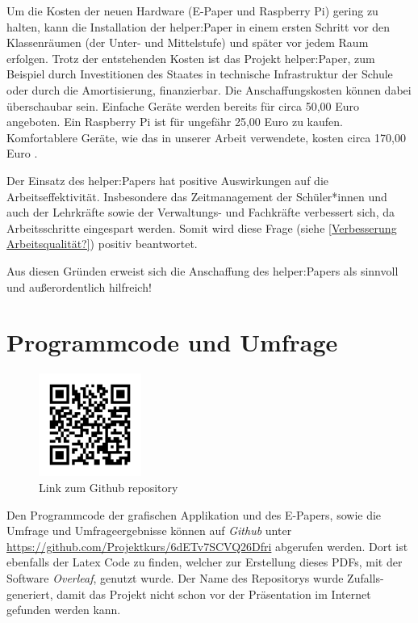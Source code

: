\documentclass[10pt]{article}
\begin{document}
Um die Kosten der neuen Hardware (E-Paper und Raspberry Pi) gering zu halten, kann die Installation der helper:Paper in einem ersten Schritt vor den Klassenräumen (der Unter- und Mittelstufe) und später vor jedem Raum erfolgen. Trotz der entstehenden Kosten ist das Projekt helper:Paper, zum Beispiel durch Investitionen des Staates in technische Infrastruktur der Schule oder durch die Amortisierung, finanzierbar. Die Anschaffungskosten können dabei überschaubar sein. Einfache Geräte werden bereits für circa 50,00 Euro \cite{günstiges_E-Paper} angeboten. Ein Raspberry Pi ist für ungefähr 25,00 Euro \cite{günstiger_RaspberryPi} zu kaufen. Komfortablere Geräte, wie das in unserer Arbeit verwendete, kosten circa 170,00 Euro \cite{ourepd}.

Der Einsatz des helper:Papers hat positive Auswirkungen auf die Arbeitseffektivität. Insbesondere das Zeitmanagement der Schüler*innen und auch der Lehrkräfte sowie der Verwaltungs- und Fachkräfte verbessert sich, da Arbeitsschritte eingespart werden. Somit wird diese Frage (siehe \ref{Verbesserung Arbeitsqualität?}) positiv beantwortet.

Aus diesen Gründen erweist sich die Anschaffung des helper:Papers als sinnvoll und außerordentlich hilfreich!
\section{Programmcode und Umfrage} 
\label{Anhang}
\begin{figure}
  \centering 
  \includegraphics[width=0.3\textwidth]{qr.png}
  \caption{Link zum Github repository}
\end{figure}
Den Programmcode der grafischen Applikation und des E-Papers, sowie die Umfrage und Umfrageergebnisse können auf \textit{Github} unter \href{https://github.com/Projektkurs/6dETv7SCVQ26Dfri}{https://github.com/Projektkurs/6dETv7SCVQ26Dfri} abgerufen werden. Dort ist ebenfalls der Latex Code zu finden, welcher zur Erstellung dieses PDFs, mit der Software \textit{Overleaf}, genutzt wurde. Der Name des Repositorys wurde Zufalls-generiert, damit das Projekt nicht schon vor der Präsentation im Internet gefunden werden kann.%
\end{document}
